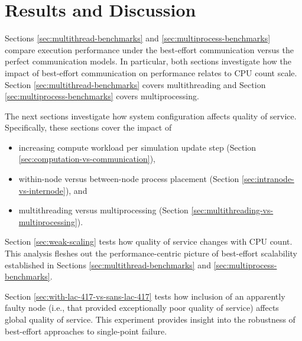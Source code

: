\section{Results and Discussion}

Sections \ref{sec:multithread-benchmarks} and \ref{sec:multiprocess-benchmarks} compare execution performance under the best-effort communication versus the perfect communication models.
In particular, both sections investigate how the impact of best-effort communication on performance relates to CPU count scale.
Section \ref{sec:multithread-benchmarks} covers multithreading and Section \ref{sec:multiprocess-benchmarks} covers multiprocessing.

The next sections investigate how system configuration affects quality of service.
Specifically, these sections cover the impact of
\begin{itemize}
  \item increasing compute workload per simulation update step (Section \ref{sec:computation-vs-communication}),
  \item within-node versus between-node process placement (Section \ref{sec:intranode-vs-internode}), and
  \item multithreading versus multiprocessing (Section \ref{sec:multithreading-vs-multiprocessing}).
\end{itemize}

Section \ref{sec:weak-scaling} tests how quality of service changes with CPU count.
This analysis fleshes out the performance-centric picture of best-effort scalability established in Sections \ref{sec:multithread-benchmarks} and \ref{sec:multiprocess-benchmarks}.

Section \ref{sec:with-lac-417-vs-sans-lac-417} tests how inclusion of an apparently faulty node (i.e., that provided exceptionally poor quality of service) affects global quality of service.
This experiment provides insight into the robustness of best-effort approaches to single-point failure.














